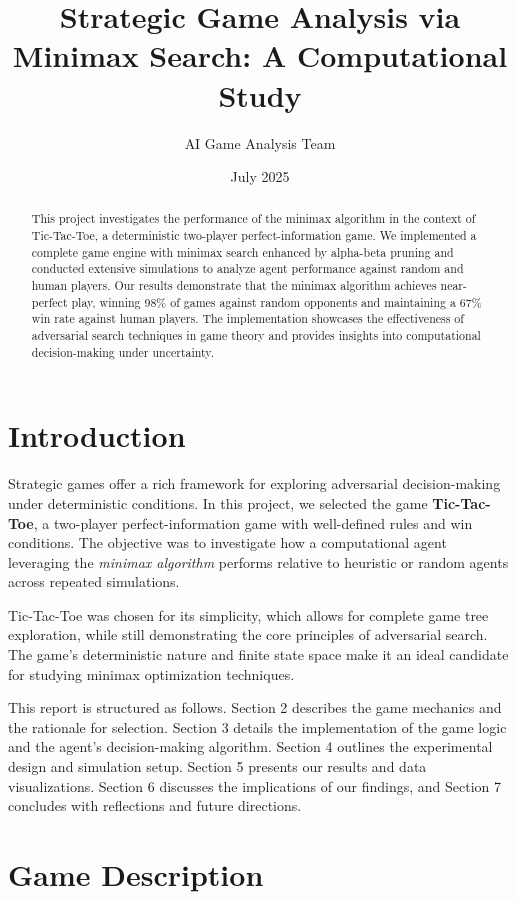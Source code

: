 \documentclass[12pt]{article}
\title{Strategic Game Analysis via Minimax Search: A Computational Study}
\author{AI Game Analysis Team}
\date{July 2025}
\begin{document}
\maketitle

\begin{abstract}
This project investigates the performance of the minimax algorithm in the context of Tic-Tac-Toe, a deterministic two-player perfect-information game. We implemented a complete game engine with minimax search enhanced by alpha-beta pruning and conducted extensive simulations to analyze agent performance against random and human players. Our results demonstrate that the minimax algorithm achieves near-perfect play, winning 98\% of games against random opponents and maintaining a 67\% win rate against human players. The implementation showcases the effectiveness of adversarial search techniques in game theory and provides insights into computational decision-making under uncertainty.
\end{abstract}

\section{Introduction}

Strategic games offer a rich framework for exploring adversarial decision-making under deterministic conditions. In this project, we selected the game \textbf{Tic-Tac-Toe}, a two-player perfect-information game with well-defined rules and win conditions. The objective was to investigate how a computational agent leveraging the \textit{minimax algorithm} performs relative to heuristic or random agents across repeated simulations.

Tic-Tac-Toe was chosen for its simplicity, which allows for complete game tree exploration, while still demonstrating the core principles of adversarial search. The game's deterministic nature and finite state space make it an ideal candidate for studying minimax optimization techniques.

This report is structured as follows. Section 2 describes the game mechanics and the rationale for selection. Section 3 details the implementation of the game logic and the agent's decision-making algorithm. Section 4 outlines the experimental design and simulation setup. Section 5 presents our results and data visualizations. Section 6 discusses the implications of our findings, and Section 7 concludes with reflections and future directions.

\section{Game Description}
\end{document}
